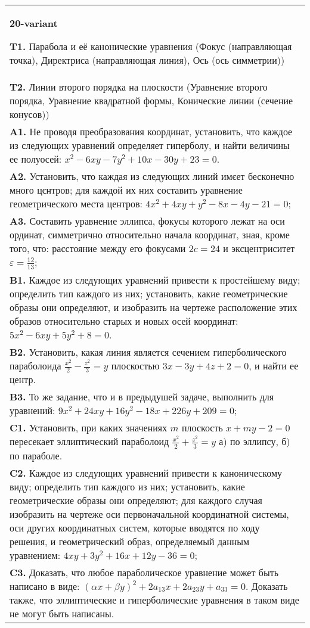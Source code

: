 \documentclass{article}
\begin{document}
\begin{tabular}{m{17cm}}
\textbf{20-variant}
\newline

\textbf{T1.} Парабола и её канонические уравнения (Фокус (направляющая точка), Директриса (направляющая линия), Ось (ось симметрии)) \\
\textbf{T2.} Линии второго порядка на плоскости (Уравнение второго порядка, Уравнение квадратной формы, Конические линии (сечение конусов)) \\
\textbf{A1.} Не проводя преобразования координат, установить, что каждое из следующих уравнений определяет гиперболу, и найти величины ее полуосей: $x^2-6 x y-7 y^2+10 x-30 y+23=0$. \\
\textbf{A2.} Установить, что каждая из следующих линий имєет бесконечно много цєнтров; для каждой их них составить уравнение геометрического места центров: $4 x^2+4 x y+y^2-8 x-4 y-21=0$; \\
\textbf{A3.} Составить уравнение эллипса, фокусы которого лежат на оси ординат, симметрично относительно начала координат, зная, кроме того, что: расстояние между его фокусами $2 c=24$ и эксцентриситет $\varepsilon=\frac{12}{13}$; \\
\textbf{B1.} Каждое из следующих уравнений привести к простейшему виду; определить тип каждого из них; установить, какие геометрические образы они определяют, и изобразить на чертеже расположение этих образов относительно старых и новых осей координат: $5 x^2-6 x y+5 y^2+8=0$. \\
\textbf{B2.} Установить, какая линия является сечением гиперболического параболоида $\frac{x^2}{2}-\frac{z^2}{3}=y$ плоскостью $3 x-3 y+4 z+2=0$, и найти ее центр. \\
\textbf{B3.} То же задание, что и в предыдушей задаче, выполнить для уравнений: $9 x^2+24 x y+16 y^2-18 x+226 y+209=0$; \\
\textbf{C1.} Установить, при каких значениях $m$ плоскость $x+m y-2=0$ пересекает эллиптический параболоид $\frac{x^2}{2}+\frac{z^2}{3}=y$ а) по эллипсу, б) по параболе. \\
\textbf{C2.} Каждое из следующих уравнений привести к каноническому виду; определить тип каждого из них; установить, какие геометрические образы они определяют; для каждого случая изобразить на чертеже оси первоначальной координатной системы, оси других координатных систем, которые вводятся по ходу решения, и геометрический образ, определяемый данным уравнением: $4 x y+3 y^2+16 x+12 y-36=0$; \\
\textbf{C3.} Доказать, что любое параболическое уравнение может быть написано в виде: $ (\alpha x+\beta y) ^2+2a_{13}x+2a_{23}y+a_{33}=0$. Доказать также, что эллиптические и гиперболические уравнения в таком виде не могут быть написаны. \\

\end{tabular}
\vspace{1cm}
\end{document}
